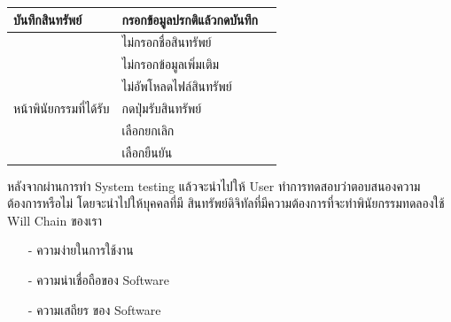\documentclass[12pt,oneside,openright,a4paper]{cpe-thai-project}
\begin{document}
\begin{table}[h]
\begin{tabular}{|l|l|l|}
บันทึกสินทรัพย์        & กรอกข้อมูลปรกติแล้วกดบันทึก                      &        \\ \hline
                       & ไม่กรอกชื่อสินทรัพย์                             &        \\ \hline
                       & ไม่กรอกข้อมูลเพิ่มเติม                          &        \\ \hline
                       & ไม่อัพโหลดไฟล์สินทรัพย์                        &        \\ \hline                    
หน้าพินัยกรรมที่ได้รับ & กดปุ่มรับสินทรัพย์                              &        \\ \hline
                       & เลือกยกเลิก                           &        \\ \hline
                       & เลือกยืนยัน                     &        \\ \hline
\end{tabular}
\end{table}
\tab หลังจากผ่านการทำ System testing แล้วจะนำไปให้ User ทำการทดสอบว่าตอบสนองความต้องการหรือไม่ โดยจะนำไปให้บุคคลที่มี สินทรัพย์ดิจิทัลที่มีความต้องการที่จะทำพินัยกรรมทดลองใช้ Will Chain ของเรา

\begin{itemize}
	\item[-] ความง่ายในการใช้งาน
	\item[-]  ความน่าเชื่อถือของ Software
	\item[-]  ความเสถียร ของ Software
\end{itemize}
\clearpage
\end{document}
